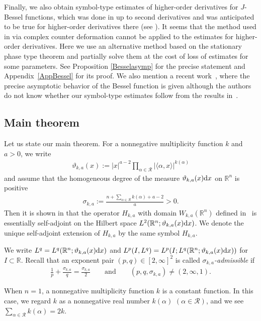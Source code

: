 \documentclass[pdftex]{sigma}
\numberwithin{equation}{section}
\def\R{\mathbb{R}}%
\def\s{\sigma}
\newcommand{\cR}{\mathcal{R}}
\begin{document}
Finally, we also obtain symbol-type estimates of higher-order derivatives for $J$-Bessel functions, which was done in \cite{IJ} up to second derivatives and was anticipated to be true for higher-order derivatives there (see \cite[Remark after Theorem 9.1]{IJ}). It seems that the method used in \cite{IJ} via complex counter deformation cannot be applied to the estimates for higher-order derivatives. Here we use an alternative method based on the stationary phase type theorem and partially solve them at the cost of loss of estimates for some parameters.
See Proposition \ref{Besselasymp} for the precise statement and Appendix~\ref{AppBessel} for its proof. We also mention a recent work~\cite{Sh}, where the precise asymptotic behavior of the Bessel function is given although the authors do not know whether our symbol-type estimates follow from the results in~\cite{Sh}.

\subsection{Main theorem}
Let us state our main theorem.
For a nonnegative multiplicity function $k$ and $a>0$, we write
\begin{align}\label{vartheta}
\vartheta_{k,a}(x):=|x|^{a-2}\prod_{\alpha\in\cR}|\langle\alpha,x\rangle|^{k(\alpha)}
\end{align}
and assume that the homogeneous degree of the measure $\vartheta_{k,a}(x){\rm d}x$ on $\R^n$ is positive
\begin{align}\label{eq:positive}
\sigma_{k,a}:=\frac{n+\sum_{\alpha\in\cR}k(\alpha)+a-2}{a}>0.
\end{align}
Then it is shown in \cite[Corollary 3.22]{BKO} that the operator $H_{k,a}$ with domain $W_{k,a}(\R^n)$ defined in~\cite[equation~(3.29)]{BKO} is essentially self-adjoint on the Hilbert space $L^2(\R^n; \vartheta_{k,a}(x) {\rm d}x)$. We denote the unique self-adjoint extension of $H_{k,a}$ by the same symbol $H_{k,a}$.

We write $L^q=L^q(\R^n;\vartheta_{k,a}(x){\rm d}x )$ and $L^p(I, L^q)=L^p(I; L^q(\R^n;\vartheta_{k,a}(x){\rm d}x ))$ for $I\subset \R$.
Recall that an exponent pair $(p,q)\in[2,\infty]^2$ is called \emph{$\sigma_{k,a}$-admissible} if
\begin{align*}%
\frac{1}{p}+\frac{\s_{k,a}}{q}=\frac{\s_{k,a}}{2} \qquad \text{and}\qquad (p,q,\s_{k,a})\neq (2,\infty,1).
\end{align*}

When $n=1$, a nonnegative multiplicity function $k$ is a constant function.
In this case, we regard $k$ as a nonnegative real number $k(\alpha)$ $(\alpha\in\cR)$, and we see $\sum_{\alpha\in\cR}k(\alpha)=2k$.
\end{document}
